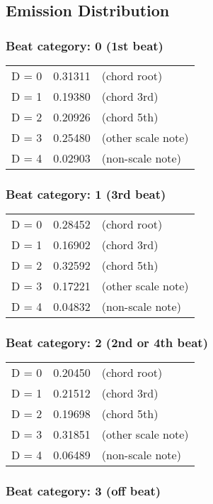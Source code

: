 \subsection{Emission Distribution}

\subsubsection*{Beat category: 0 (1st beat)}


\begin{tabular}{l l l}
D = 0 & 0.31311 & (chord root)\\
D = 1 & 0.19380 & (chord 3rd)\\
D = 2 & 0.20926 & (chord 5th)\\
D = 3 & 0.25480 & (other scale note)\\
D = 4 & 0.02903 & (non-scale note)\\
\end{tabular}


\subsubsection*{Beat category: 1 (3rd beat)}


\begin{tabular}{l l l}
D = 0 & 0.28452 & (chord root)\\
D = 1 & 0.16902 & (chord 3rd)\\
D = 2 & 0.32592 & (chord 5th)\\
D = 3 & 0.17221 & (other scale note)\\
D = 4 & 0.04832 & (non-scale note)\\
\end{tabular}


\subsubsection*{Beat category: 2 (2nd or 4th beat)}


\begin{tabular}{l l l}
D = 0 & 0.20450 & (chord root)\\
D = 1 & 0.21512 & (chord 3rd)\\
D = 2 & 0.19698 & (chord 5th)\\
D = 3 & 0.31851 & (other scale note)\\
D = 4 & 0.06489 & (non-scale note)\\
\end{tabular}


\subsubsection*{Beat category: 3 (off beat)}


